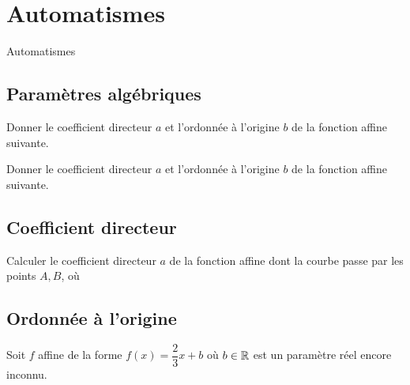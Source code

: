
\AdvanceDate[2]



\section{Automatismes}

\begin{frame}

\centering \huge
Automatismes

\end{frame}

\subsection{Paramètres algébriques}

\begin{frame}{1}	
	Donner le coefficient directeur $a$ et l'ordonnée à l'origine $b$ de la fonction affine suivante.
	\boxAB{
		\[ f(x) = 4 - x \]
	}{
		\[ g(x) = 2+x \]
	}
\end{frame}

\begin{frame}{2}	
	Donner le coefficient directeur $a$ et l'ordonnée à l'origine $b$ de la fonction affine suivante.
	\boxAB{
		\[ F(x) = 2x \]
	}{
		\[ G(x) = 3 \]
	}
\end{frame}

\subsection{Coefficient directeur}

\begin{frame}{3}

	Calculer le coefficient directeur $a$ de la fonction affine dont la courbe passe par les points $A, B$, où
	
\end{frame}


\subsection{Ordonnée à l'origine}

\begin{frame}{4}

	Soit $f$ affine de la forme $f(x) = \dfrac23 x + b$ où $b\in\mathbb{R}$ est un paramètre réel encore inconnu.
	
\end{frame}



